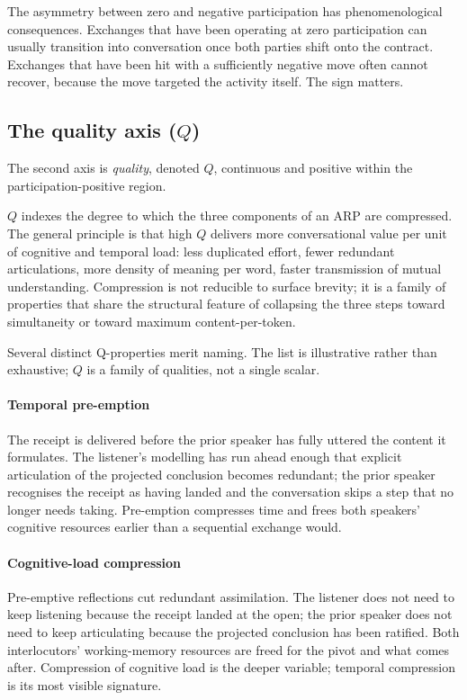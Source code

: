 The asymmetry between zero and negative participation has phenomenological consequences. Exchanges that have been operating at zero participation can usually transition into conversation once both parties shift onto the contract. Exchanges that have been hit with a sufficiently negative move often cannot recover, because the move targeted the activity itself. The sign matters.

\subsection{The quality axis ($Q$)}

The second axis is \emph{quality}, denoted $Q$, continuous and positive within the participation-positive region.

$Q$ indexes the degree to which the three components of an ARP are compressed. The general principle is that high $Q$ delivers more conversational value per unit of cognitive and temporal load: less duplicated effort, fewer redundant articulations, more density of meaning per word, faster transmission of mutual understanding. Compression is not reducible to surface brevity; it is a family of properties that share the structural feature of collapsing the three steps toward simultaneity or toward maximum content-per-token.

Several distinct Q-properties merit naming. The list is illustrative rather than exhaustive; $Q$ is a family of qualities, not a single scalar.

\paragraph{Temporal pre-emption} The receipt is delivered before the prior speaker has fully uttered the content it formulates. The listener's modelling has run ahead enough that explicit articulation of the projected conclusion becomes redundant; the prior speaker recognises the receipt as having landed and the conversation skips a step that no longer needs taking. Pre-emption compresses time and frees both speakers' cognitive resources earlier than a sequential exchange would.

\paragraph{Cognitive-load compression} Pre-emptive reflections cut redundant assimilation. The listener does not need to keep listening because the receipt landed at the open; the prior speaker does not need to keep articulating because the projected conclusion has been ratified. Both interlocutors' working-memory resources are freed for the pivot and what comes after. Compression of cognitive load is the deeper variable; temporal compression is its most visible signature.

